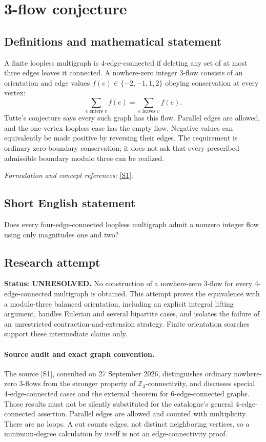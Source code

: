 \documentclass[11pt]{article}
\begin{document}
\section*{\texorpdfstring{3-flow conjecture}{3-flow conjecture}}\label{statement}
\subsection{Definitions and mathematical statement}
A finite loopless multigraph is $4$-edge-connected if deleting any set of at most three edges leaves it connected. A nowhere-zero integer $3$-flow consists of an orientation and edge values $f(e)\in\{-2,-1,1,2\}$ obeying conservation at every vertex:
\[
 \sum_{e\text{ enters }v} f(e)=\sum_{e\text{ leaves }v}f(e).
\]
Tutte's conjecture says every such graph has this flow. Parallel edges are allowed, and the one-vertex loopless case has the empty flow. Negative values can equivalently be made positive by reversing their edges. The requirement is ordinary zero-boundary conservation; it does not ask that every prescribed admissible boundary modulo three can be realized.
\par\smallskip\textit{Formulation and concept references:} \href{https://arxiv.org/pdf/1406.1554}{[S1]}.

\subsection{Short English statement}
Does every four-edge-connected loopless multigraph admit a nonzero integer flow using only magnitudes one and two?
\subsection{Research attempt}
\textbf{Status: UNRESOLVED.} No construction of a nowhere-zero 3-flow for every 4-edge-connected multigraph is obtained. This attempt proves the equivalence with a modulo-three balanced orientation, including an explicit integral lifting argument, handles Eulerian and several bipartite cases, and isolates the failure of an unrestricted contraction-and-extension strategy. Finite orientation searches support these intermediate claims only.

\paragraph{Source audit and exact graph convention.}
The source [S1], consulted on 27 September 2026, distinguishes ordinary nowhere-zero 3-flows from the stronger property of $\mathbb Z_3$-connectivity, and discusses special 4-edge-connected cases and the external theorem for 6-edge-connected graphs. Those results must not be silently substituted for the catalogue's general 4-edge-connected assertion. Parallel edges are allowed and counted with multiplicity. There are no loops. A cut counts edges, not distinct neighboring vertices, so a minimum-degree calculation by itself is not an edge-connectivity proof.
\end{document}
